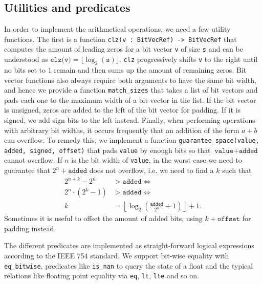 \documentclass[a4paper,UKenglish,cleveref, autoref, thm-restate]{lipics-v2019}
\begin{document}
\subsection{Utilities and predicates}
In order to implement the arithmetical operations, we need a few utility functions. The first is a function \verb|clz(v : BitVecRef) -> BitVecRef| that computes the amount of leading zeros for a bit vector \verb|v| of size \verb|s| and can be understood as $\texttt{clz(v)} = \lfloor \log_2(\texttt{s}) \rfloor$. \verb|clz| progressively shifts \verb|v| to the right until no bits set to $1$ remain and then sums up the amount of remaining zeros. 
Bit vector functions also always require both arguments to have the same bit width, and hence we provide a function \verb|match_sizes| that takes a list of bit vectors and pads each one to the maximum width of a bit vector in the list. If the bit vector is unsigned, zeros are added to the left of the bit vector for padding. If it is signed, we add sign bits to the left instead.
Finally, when performing operations with arbitrary bit widths, it occurs frequently that an addition of the form $a + b$ can overflow. To remedy this, we implement a function \verb|guarantee_space(value, added, signed, offset)| that pads \verb|value| by enough bits so that $\texttt{value} + \texttt{added}$ cannot overflow. If $n$ is the bit width of \verb|value|, in the worst case we need to guarantee that $2^n + \texttt{added}$ does not overflow, i.e. we need to find a $k$ such that
\begin{align*}
2^{n + k} - 2^n &> \texttt{added} \iff \\
2^n \cdot (2^k - 1) &> \texttt{added} \iff \\
k &= \left\lfloor \log_2\left(\frac{\texttt{added}}{2^n} + 1\right) \right\rfloor + 1.
\end{align*}
Sometimes it is useful to offset the amount of added bits, using $k + \texttt{offset}$ for padding instead.

The different predicates are implemented as straight-forward logical expressions according to the IEEE 754 standard. We support bit-wise equality with \verb|eq_bitwise|, predicates like \verb|is_nan| to query the state of a float and the typical relations like floating point equality via \verb|eq|, \verb|lt|, \verb|lte| and so on.
\end{document}
